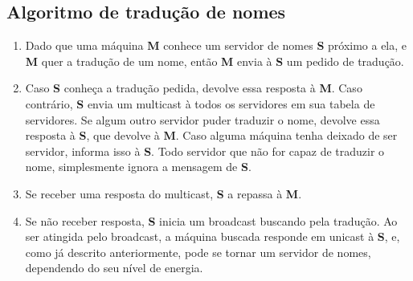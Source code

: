     \subsection{Algoritmo de tradução de nomes}
        \begin{enumerate}
            \item Dado que uma máquina \textbf{M} conhece um servidor de nomes
            \textbf{S} próximo a ela, e \textbf{M} quer a tradução de um nome,
            então \textbf{M} envia à \textbf{S} um pedido de tradução.
            \item Caso \textbf{S} conheça a tradução pedida, devolve essa resposta
            à \textbf{M}. Caso contrário, \textbf{S} envia um multicast à todos
            os servidores em sua tabela de servidores. Se algum outro servidor
            puder traduzir o nome, devolve essa resposta à \textbf{S}, que devolve
            à \textbf{M}. Caso alguma máquina tenha deixado de ser servidor,
            informa isso à \textbf{S}. Todo servidor que não for capaz de traduzir
            o nome, simplesmente ignora a mensagem de \textbf{S}.
            \item Se receber uma resposta do multicast, \textbf{S} a repassa à
            \textbf{M}.
            \item Se não receber resposta, \textbf{S} inicia um broadcast buscando
            pela tradução. Ao ser atingida pelo broadcast, a máquina buscada
            responde em unicast à \textbf{S}, e, como já descrito anteriormente,
            pode se tornar um servidor de nomes, dependendo do seu nível de energia.
        \end{enumerate}
    